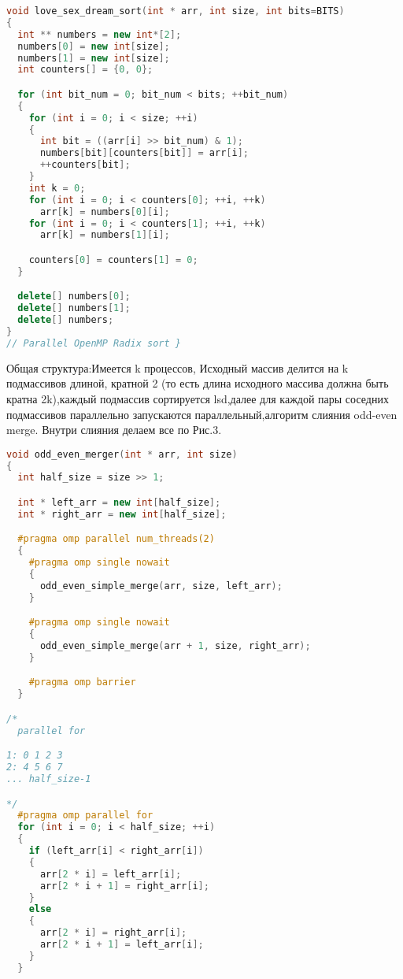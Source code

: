 \documentclass[a4paper,final]{report}
\begin{document}
\begin{spacing}{1.5}
\begin{lstlisting}[language=C++]
void love_sex_dream_sort(int * arr, int size, int bits=BITS)
{
  int ** numbers = new int*[2];
  numbers[0] = new int[size];
  numbers[1] = new int[size];
  int counters[] = {0, 0};

  for (int bit_num = 0; bit_num < bits; ++bit_num)
  {
    for (int i = 0; i < size; ++i)
    {
      int bit = ((arr[i] >> bit_num) & 1);
      numbers[bit][counters[bit]] = arr[i];
      ++counters[bit];
    }
    int k = 0;
    for (int i = 0; i < counters[0]; ++i, ++k)
      arr[k] = numbers[0][i];
    for (int i = 0; i < counters[1]; ++i, ++k)
      arr[k] = numbers[1][i];

    counters[0] = counters[1] = 0;
  }

  delete[] numbers[0];
  delete[] numbers[1];
  delete[] numbers;
}
// Parallel OpenMP Radix sort }
\end{lstlisting}
		\par Общая структура:Имеется k процессов, Исходный массив делится на k подмассивов длиной, кратной 2 (то есть длина исходного массива должна быть кратна 2k),каждый подмассив сортируется lsd,далее для каждой пары соседних подмассивов параллельно запускаются параллельный,алгоритм слияния odd-even merge. Внутри слияния делаем все по Рис.3.
				\begin{spacing}{0}
\end{spacing}

\begin{lstlisting}[language=C++]
void odd_even_merger(int * arr, int size)
{
  int half_size = size >> 1; 

  int * left_arr = new int[half_size];
  int * right_arr = new int[half_size];

  #pragma omp parallel num_threads(2)
  {
    #pragma omp single nowait
    {
      odd_even_simple_merge(arr, size, left_arr);
    }

    #pragma omp single nowait
    {
      odd_even_simple_merge(arr + 1, size, right_arr);
    }

    #pragma omp barrier
  }

/*
  parallel for

1: 0 1 2 3
2: 4 5 6 7
... half_size-1

*/
  #pragma omp parallel for
  for (int i = 0; i < half_size; ++i)
  {
    if (left_arr[i] < right_arr[i])
    {
      arr[2 * i] = left_arr[i];
      arr[2 * i + 1] = right_arr[i];
    }
    else
    {
      arr[2 * i] = right_arr[i];
      arr[2 * i + 1] = left_arr[i];
    }
  }



\end{lstlisting}
\end{spacing}
\end{document}
